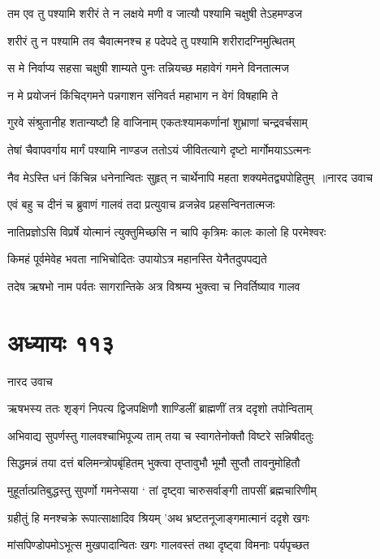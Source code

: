 \twolineshloka
{तम एव तु पश्यामि शरीरं ते न लक्षये}
{मणी व जात्यौ पश्यामि चक्षुषी तेऽहमण्डज}


\twolineshloka
{शरीरं तु न पश्यामि तव चैवात्मनश्च ह}
{पदेपदे तु पश्यामि शरीरादग्निमुत्थितम्}


\twolineshloka
{स मे निर्वाप्य सहसा चक्षुषी शाम्यते पुनः}
{तन्नियच्छ महावेगं गमने विनतात्मज}


\twolineshloka
{न मे प्रयोजनं किंचिद्गमने पन्नगाशन}
{संनिवर्त महाभाग न वेगं विषहामि ते}


\twolineshloka
{गुरवे संश्रुतानीह शतान्यष्टौ हि वाजिनाम्}
{एकतःश्यामकर्णानां शुभ्राणां चन्द्रवर्चसाम्}


\twolineshloka
{तेषां चैवापवर्गाय मार्गं पश्यामि नाण्डज}
{ततोऽयं जीवितत्यागे दृष्टो मार्गोमयाऽऽत्मनः}


\threelineshloka
{नैव मेऽस्ति धनं किंचिन्न धनेनान्वितः सुहृत्}
{न चार्थेनापि महता शक्यमेतद्व्यपोहितुम् ॥नारद उवाच}
{}


\twolineshloka
{एवं बहु च दीनं च ब्रुवाणं गालवं तदा}
{प्रत्युवाच व्रजन्नेव प्रहसन्विनतात्मजः}


\twolineshloka
{नातिप्रज्ञोऽसि विप्रर्षे योत्मानं त्युक्तुमिच्छसि}
{न चापि कृत्रिमः कालः कालो हि परमेश्वरः}


\twolineshloka
{किमहं पूर्वमेवेह भवता नाभिचोदितः}
{उपायोऽत्र महानस्ति येनैतदुपपद्यते}


\twolineshloka
{तदेष ऋषभो नाम पर्वतः सागरान्तिके}
{अत्र विश्रम्य भुक्त्वा च निवर्तिष्याव गालव}


\chapter{अध्यायः ११३}
\twolineshloka
{नारद उवाच}
{}


\twolineshloka
{ऋषभस्य ततः शृङ्गं निपत्य द्विजपक्षिणौ}
{शाण्डिलीं ब्राह्मणीं तत्र ददृशो तपोन्विताम्}


\twolineshloka
{अभिवाद्य सुपर्णस्तु गालवश्चाभिपूज्य ताम्}
{तया च स्वागतेनोक्तौ विष्टरे सन्निषीदतुः}


\twolineshloka
{सिद्धमन्नं तया दत्तं बलिमन्त्रोपबृंहितम्}
{भुक्त्वा तृप्तावुभौ भूमौ सुप्तौ तावनुमोहितौ}


\twolineshloka
{मुहूर्तात्प्रतिबुद्धस्तु सुपर्णो गमनेप्सया}
{` तां दृष्ट्वा चारुसर्वाङ्गी तापसीं ब्रह्मचारिणीम्}


\twolineshloka
{ग्रहीतुं हि मनश्चक्रे रूपात्साक्षादिव श्रियम्}
{'अथ भ्रष्टतनूजाङ्गमात्मानं ददृशे खगः}


\twolineshloka
{मांसपिण्डोपमोऽभूत्स मुखपादान्वितः खगः}
{गालवस्तं तथा दृष्ट्वा विमनाः पर्यपृच्छत}


